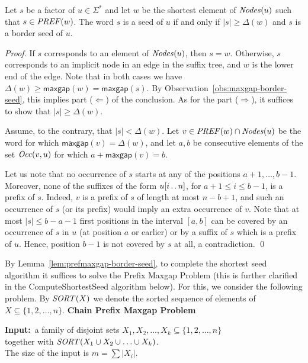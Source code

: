 \documentclass{llncs}
\newcommand{\Nodes}{\mbox{\textit{Nodes}}}
\newcommand{\Occ}{\mbox{\textit{Occ}}}
\newcommand{\maxgap}{\textsf{maxgap}}
\newcommand{\prefmaxgap}{\Delta}
\newcommand{\SORT}{\mbox{\textit{SORT}}}
\newcommand{\PREF}{\mbox{\textit{PREF}}}
\def\dotdot{\mathinner{\ldotp\ldotp}}
\begin{document}
  \begin{lemma}\label{lem:prefmaxgap-border-seed}
    Let $s$ be a factor of $u \in \Sigma^*$ and let $w$ be the shortest element
    of $\Nodes(u)$ such that $s \in \PREF(w)$.
    The word $s$ is a seed of $u$ if and only if $|s| \ge \prefmaxgap(w)$
    and $s$ is a border seed of $u$.
  \end{lemma}
  \begin{proof}
    If $s$ corresponds to an element of $\Nodes(u)$, then $s=w$. 
    Otherwise, $s$ corresponds to an implicit node in an edge in the suffix tree, and 
    $w$ is the lower end of the edge. 
    Note that in both cases we have $\prefmaxgap(w) \ge \maxgap(w) = \maxgap(s)$. 
    By Observation~\ref{obs:maxgap-border-seed},
    this implies part ($\Leftarrow$) of the conclusion.
    As for the part ($\Rightarrow$), it suffices to show that $|s| \ge \prefmaxgap(w)$.

    Assume, to the contrary, that $|s| < \prefmaxgap(w)$.
    Let $v \in \PREF(w) \cap \Nodes(u)$ be the word for which $\maxgap(v)=\prefmaxgap(w)$,
    and let $a,b$ be consecutive elements of the set $\Occ(v,u)$ for which $a+\maxgap(v)=b$.

    Let us note that no occurrence of $s$ starts at any of the positions $a+1,\ldots,b-1$.
    Moreover, none of the suffixes of the form $u[i \dotdot n]$, for $a+1 \le i \le b-1$,
    is a prefix of $s$. 
    Indeed, $v$ is a prefix of $s$ of length at most $n-b+1$, 
    and such an occurrence of $s$ (or its prefix) would imply an extra occurrence of $v$. 
    Note that at most $|s| \le b-a-1$ first positions in the interval
    $[a,b]$ can be covered by an occurrence of $s$ in $u$ (at position $a$ or earlier) or by
    a suffix of $s$ which is a prefix of $u$.
    Hence, position $b-1$ is not covered by $s$ at all, a contradiction.
    \qed
  \end{proof}

  \noindent
  By Lemma~\ref{lem:prefmaxgap-border-seed}, to complete the shortest seed algorithm
  it suffices to solve the Prefix Maxgap Problem (this is further clarified in the
  ComputeShortestSeed algorithm below).
  For this, we consider the following problem.
  By $\SORT(X)$ we denote the sorted sequence of elements of $X\subseteq \{1,2,\ldots,n\}$.
\vskip 0.3cm
  \smallskip
  \noindent
  {\bf Chain Prefix Maxgap Problem}

  {\bf Input:}\ a family of disjoint sets $X_1, X_2,\ldots, X_k\subseteq \{1,2,\ldots,n\}$ \\
  \hspace*{1.6cm} together with $\SORT(X_1 \cup X_2 \cup \ldots \cup X_k)$.\\
  \hspace*{1.6cm} The size of the input is $m = \sum|X_i|$.
\end{document}
